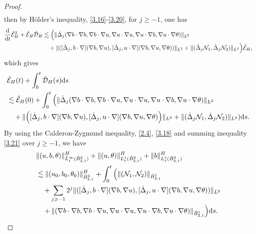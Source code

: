 \documentclass[reqno]{amsart}
\begin{document}
\begin{proof}
\begin{equation}
\begin{aligned}
\end{aligned}
\end{equation}
then by H\"older's inequality, \eqref{3.16}-\eqref{3.20}, for $j\geqslant -1$, 
one has
\begin{align*}
\frac{\rm d}{{\rm d}t}\tilde{\mathcal{E}}_H^2+\tilde{\mathcal{E}}_H
 \tilde{\mathcal{D}}_H 
&\lesssim\Big{(}\|\dot{\Delta}_j
 (\nabla b\cdot\nabla b,\nabla b\cdot\nabla u,\nabla u
 \cdot\nabla u,\nabla u\cdot\nabla b,
 \nabla u\cdot\nabla \theta)\|_{L^2}\\
&\quad +\|([\dot{\Delta}_j,b\cdot\nabla](\nabla b,\nabla u),[\dot{\Delta}_j,u\cdot\nabla]
 (\nabla b,\nabla u,\nabla\theta))\|_{L^2}
 +\|(\dot{\Delta}_j \mathcal{N}_1,\dot{\Delta}_j \mathcal{N}_2)\|_{L^2}\Big{)}
 \tilde{\mathcal{E}}_H,
\end{align*}
which gives 
 \begin{equation}\label{3.21}
\begin{aligned}
&\tilde{\mathcal{E}}_H(t)+\int_0^t\tilde{\mathcal{D}}_H(s){\rm d}s \\
&\lesssim\tilde{\mathcal{E}}_H(0)+\int_0^t\Big(\|\dot{\Delta}_j
 (\nabla b\cdot\nabla b,\nabla b\cdot\nabla u,\nabla u\cdot\nabla u,
 \nabla u\cdot\nabla b,  \nabla u\cdot\nabla \theta)\|_{L^2} \\
&\quad +\|\Big([\dot{\Delta}_j,b\cdot\nabla](\nabla b,\nabla u),[\dot{\Delta}_j,
 u\cdot\nabla](\nabla b,\nabla u,\nabla\theta)\Big)\|_{L^2}
 +\|(\dot{\Delta}_j \mathcal{N}_1,\dot{\Delta}_j \mathcal{N}_2)\|_{L^2}){\rm d}s.
\end{aligned}
\end{equation}
By using the Calderon-Zygmund inequality, \eqref{2.4}, \eqref{3.18} and summing 
inequality \eqref{3.21} over $j\geqslant -1$, we have
\begin{equation}\label{3.22}
\begin{aligned}
&\|(u,b,\theta)\|_{\tilde{L}^\infty_t(\dot{B}^2_{2,1})}^H
  +\|(u,\theta)\|_{{L}^1_t(\dot{B}^2_{2,1})}^H+\|b\|_{{L}^1_t(\dot{B}^3_{2,1})}^H \\
&\lesssim\|(u_0,b_0,\theta_0)\|_{\dot{B}^2_{2,1}}^H+\int_0^t\Big{(}\|( \mathcal{N}_1, 
 \mathcal{N}_2)\|_{\dot{B}^1_{2,1}} \\
&\quad +\sum_{j\geqslant-1}2^j\|([\dot{\Delta}_j,b\cdot\nabla](\nabla b,\nabla u),
 [\dot{\Delta}_j,u\cdot\nabla](\nabla b,\nabla u,\nabla\theta))\|_{L^2} \\
&\quad +\|(\nabla b\cdot\nabla b,\nabla b\cdot\nabla u,\nabla u\cdot\nabla u,
 \nabla u\cdot\nabla b,\nabla u\cdot\nabla \theta)\|_{\dot{B}^1_{2,1}}\Big{)}{\rm d}s.
\end{aligned}
\end{equation}


\end{proof}
\end{document}
